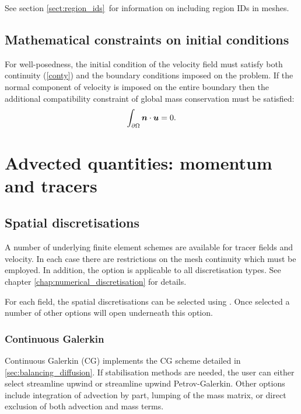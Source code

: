 See section \ref{sect:region_ids}\ for information on including region IDs
in meshes.

\subsection{Mathematical constraints on initial conditions}\label{Sect:ICs}

For well-posedness, the initial condition of the velocity field must
satisfy both continuity (\ref{conty}) and the boundary conditions
imposed on the problem. If the normal component of velocity is
imposed on the entire boundary then the additional
compatibility constraint of global mass conservation must be
satisfied:
\begin{equation*}
\int_{\partial\Omega}{\mbox{\boldmath$n$}}\cdot{\mbox{\boldmath$u$}}=0.
\end{equation*}

\section{Advected quantities: momentum and tracers}
\label{config:spatial}

\subsection{Spatial discretisations}\label{Sect:Spatial discretisations}

A number of underlying finite element schemes are available for tracer
fields and velocity. In each case there are restrictions on the mesh
continuity which must be employed. In addition, the \onlypdf\linebreak
{} option is applicable to all discretisation
types. See chapter \ref{chap:numerical_discretisation} for details.

For each field, the spatial discretisations can be selected using
.  Once selected a number
of other options will open underneath this option.

\subsubsection{Continuous Galerkin}
\label{sect:configuring_fluidity_continuous_galerkin}

Continuous Galerkin (CG) implements the CG scheme detailed in \ref{sec:balancing_diffusion}. If stabilisation methods are needed, the user can either select streamline upwind or streamline upwind Petrov-Galerkin. Other options include integration of advection by part, lumping of the mass matrix, or direct exclusion of both advection and mass terms.

